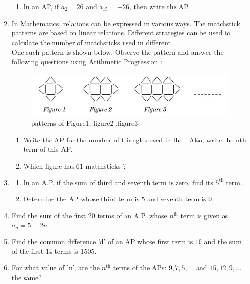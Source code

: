 \documentclass{article}
\begin{document}
\begin{enumerate}
\begin{enumerate}
        \item In an AP, if $a_2=26$ and $a _ {15} = -26$, then write the AP.
        \end{enumerate}
        \item In Mathematics, relations can be expressed in various ways. The 
matchstick patterns are based on linear relations. Different strategies 
can be used to calculate the number of matchsticks used in different 
 \\One such pattern is shown below. Observe the pattern and answer the 
following questions using Arithmetic Progression :
\begin{figure}[H]
    \centering
	\includegraphics[width=\columnwidth]{figs/ap.jpg}
	\caption{patterns of Figure1, figure2 ,figure3}
    \label{fig:ap}
\end{figure}
    \begin{enumerate}
	    \item Write the AP for the number of triangles used in the . Also, 
write the nth term of this AP.
\item Which figure has $61$ matchsticks ? 
    \end{enumerate} 

    \item 
    \begin{enumerate}
        \item In an A.P. if the sum of third and seventh term is zero, find its $5^{\text{th}}$ term.
        
        \item Determine the AP whose third term is $5$ and seventh term is $9$.
        \end{enumerate}

    
        \item Find the sum of the first $20$ terms of an A.P. whose $n^{\text{th}}$ term is given as $a_n=5-2n$
    
    
        \item Find the common difference 'd' of an AP whose first term is $10$ and the sum of the first $14$ terms is $1505$.

        \item For what value of 'n', are the $n^{\text{th}}$ terms of the APs: $9,7,5,\dots$ and $15,12,9,\dots$ the same?


\end{enumerate}
\end{document}
